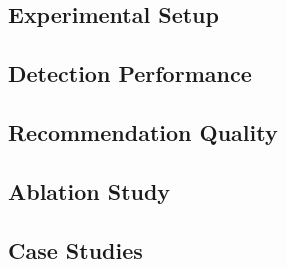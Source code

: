 
\subsection{Experimental Setup}
\label{sec:eval:setup}


\subsection{Detection Performance}
\label{sec:eval:detection}


\subsection{Recommendation Quality}
\label{sec:eval:recs}


\subsection{Ablation Study}
\label{sec:eval:ablation}


\subsection{Case Studies}
\label{sec:eval:cases}

